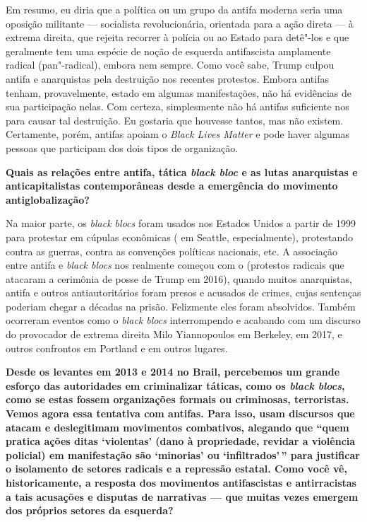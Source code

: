 Em resumo, eu diria que a política ou um grupo da antifa moderna seria uma oposição militante --- socialista revolucionária, orientada para a ação direta --- à extrema direita, que rejeita recorrer à polícia ou ao Estado para detê"-los e que geralmente tem uma espécie de noção de esquerda antifascista amplamente radical (pan"-radical), embora nem sempre. Como você sabe, Trump culpou antifa e anarquistas pela destruição nos recentes protestos. Embora antifas tenham, provavelmente, estado em algumas manifestações, não há evidências de sua participação nelas. Com certeza, simplesmente não há antifas suficiente nos  para causar tal destruição. Eu gostaria que houvesse tantos, mas não existem. Certamente, porém, antifas apoiam o \emph{Black Lives Matter} e pode haver algumas pessoas que participam dos dois tipos de organização. 

\bigskip
 
\noindent{}\textbf{Quais as relações entre antifa, tática \emph{black bloc} e as lutas anarquistas e anticapitalistas contemporâneas desde a emergência do movimento antiglobalização?}
 
Na maior parte, os \emph{black blocs} foram usados nos Estados Unidos a partir de 1999 para protestar em cúpulas econômicas ( em Seattle, especialmente), protestando contra as guerras, contra as convenções políticas nacionais, etc. A associação entre antifa e \emph{black blocs} nos  realmente começou com o  (protestos radicais que atacaram a cerimônia de posse de Trump em 2016), quando muitos anarquistas, antifa e outros antiautoritários foram presos e acusados de crimes, cujas sentenças poderiam chegar a décadas na prisão. Felizmente eles foram absolvidos. Também ocorreram eventos como o \emph{black blocs} interrompendo e acabando com um discurso do provocador de extrema direita Milo Yiannopoulos em Berkeley, em 2017, e outros confrontos em Portland e em outros lugares. 

\bigskip

\noindent{}\textbf{Desde os levantes em 2013 e 2014 no Brail, percebemos um grande esforço das autoridades em criminalizar táticas, como os \emph{black blocs}, como se estas fossem organizações formais ou criminosas, terroristas. Vemos agora essa tentativa com antifas. Para isso, usam discursos que atacam e deslegitimam movimentos combativos, alegando que ``quem pratica ações ditas `violentas' (dano à propriedade, revidar a violência policial) em manifestação são `minorias' ou `infiltrados'\,'' para justificar o isolamento de setores radicais e a repressão estatal. Como você vê, historicamente, a resposta dos movimentos antifascistas e antirracistas a tais acusações e disputas de narrativas --- que muitas vezes emergem dos próprios setores da esquerda?}
 
